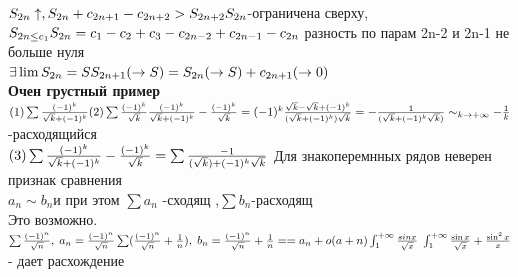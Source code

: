 \documentclass[12pt, a4paper]{article}
\begin{document}
         $ S_{2n} \uparrow,  S_{2n}+c_{2n+1} - c_{2n +2} > S_{2n+2}  \\
         S_{2n}$-ограничена сверху, $ S_{2n \leq c_1} \\
         S_{2n}= c_1 -  c_2 + c_3- c_{2n-2} + c_{2n-1}  - c_{2n}$ разность по парам 2n-2 и  2n-1  не больше нуля \\
         $ \exists \lim S_{2n} = S \\
         S_{2n+1}(\rightarrow S)=S_{2n}(\rightarrow S)+ c_{2n + 1}(\rightarrow 0) $\\
         \textbf{Очен грустный пример}\\
          $ (1)\sum \frac{(-1)^k}{\sqrt{k}+(-1)^k} \\
         (2)  \sum \frac{(-1)^k}{\sqrt{k}} \\
           \frac{(-1)^k}{\sqrt{k}+(-1)^k} - \frac{(-1)^k}{\sqrt{k}}=(-1)^k \frac{\sqrt{k} - \sqrt{k}+(-1)^k}{(\sqrt{k}+(-1)^k)\sqrt{k}}= -\frac{1}{(\sqrt{k}+(-1)^k \sqrt{k})} \sim_{k \rightarrow +\infty} - \frac{1}{k} \\$ -расходящийся \\
           $ (3) \sum \frac{(-1)^k}{\sqrt{k} + (-1)^k} - \frac{(-1)^k}{\sqrt{k}} = \sum \frac{-1}{(\sqrt{k})+(-1)^k \sqrt{k}} \\$
           Для знакоперемнных рядов  неверен признак сравнения \\
           $ a_n \sim b_n $и при этом  $\sum a_n$ -сходящ ,$ \sum b_n$-расходящ  \\ Это возможно. \\
           $ \sum \frac{(-1)^n}{\sqrt{n}}, \; a_n = \frac{(-1)^n}{\sqrt{n}} \\
           \sum (\frac{(-1)^n}{\sqrt{n}} +\frac{1}{n}), \; b_n = \frac{(-1)^n}{\sqrt{n}}+\frac{1}{n} == a_n + o(a+n)\\
           \int_{1}^{+ \infty} \frac{sin x}{\sqrt{x}} \; \int_1^{+\infty} \frac{\sin x}{\sqrt{x}} + \frac{\sin^2x }{x}   $- дает расхождение\\
\end{document}
